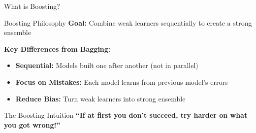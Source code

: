 \documentclass[8pt]{beamer}
\begin{document}
\begin{frame}{What is Boosting?}
\begin{definitionbox}{Boosting Philosophy}
\textbf{Goal:} Combine weak learners sequentially to create a strong ensemble
\end{definitionbox}

\begin{keypointsbox}
\textbf{Key Differences from Bagging:}
\begin{itemize}
\item \textbf{Sequential:} Models built one after another (not in parallel)
\item \textbf{Focus on Mistakes:} Each model learns from previous model's errors
\item \textbf{Reduce Bias:} Turn weak learners into strong ensemble
\end{itemize}
\end{keypointsbox}

\begin{examplebox}{The Boosting Intuition}
\textbf{``If at first you don't succeed, try harder on what you got wrong!''}
\end{examplebox}
\end{frame}
\end{document}
